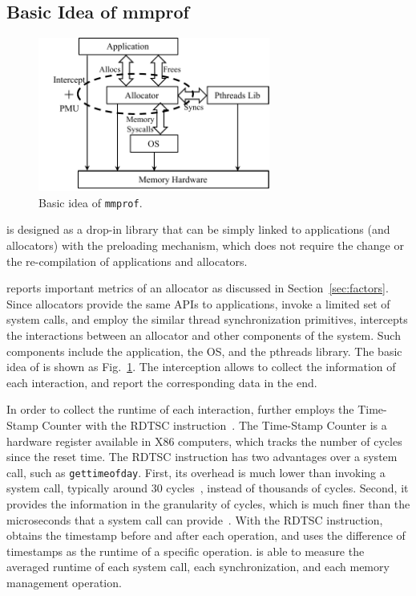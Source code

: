 \subsection{Basic Idea of mmprof}
\label{sec:idea}

\begin{figure}[!ht]
\centering
\includegraphics[width=3in]{figures/overview}
\caption{Basic idea of \texttt{mmprof}.\label{fig:basicidea}}
\end{figure}

\MP{} is designed as a drop-in library that can be simply linked to applications (and allocators) with the preloading mechanism, which does not require the change or the re-compilation of applications and allocators.

\MP{} reports important metrics of an  allocator as discussed in Section~\ref{sec:factors}. Since allocators provide the same APIs to applications, invoke a limited set of system calls, and employ the similar thread synchronization primitives, \MP{} intercepts the interactions between an allocator and other components of the system. Such components include the application, the OS, and the pthreads library. The basic idea of \MP{} is shown as Fig.~\ref{fig:basicidea}. The interception allows \MP{} to collect the information of each interaction, and report the corresponding data in the end. 

In order to collect the runtime of each interaction, \MP{} further employs the Time-Stamp Counter with the RDTSC instruction~\cite{coorporation1997using}. The Time-Stamp Counter is a hardware register available in X86 computers, which tracks the number of cycles since the reset time. The RDTSC instruction has two advantages over a system call, such as \texttt{gettimeofday}. First, its overhead is much lower than invoking a system call, typically around 30  cycles~\cite{rdtscoverhead}, instead of thousands of cycles. Second, it provides the information in the granularity of cycles, which is much finer than the microseconds that a system call can provide~\cite{pitfallsrdtsc}. With the RDTSC instruction, \MP{} obtains the timestamp before and after each operation, and uses the difference of timestamps as the runtime of a specific operation. \MP{} is able to measure the averaged runtime of each system call, each synchronization, and each memory management operation. 

